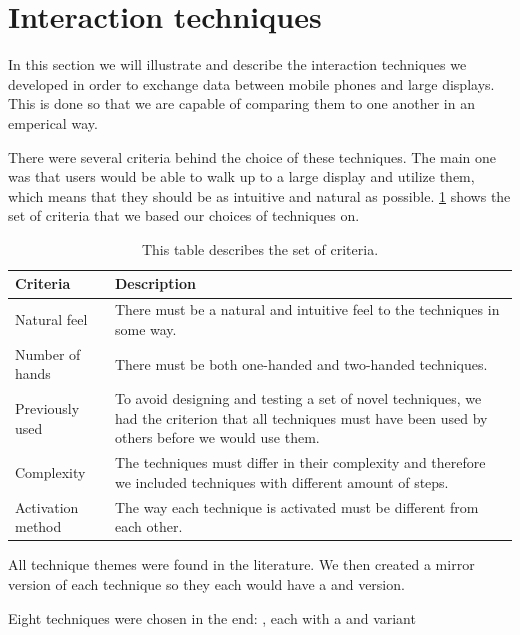 \section{Interaction techniques} \label{sec:techniques}
In this section we will illustrate and describe the interaction techniques we developed in order to exchange data between mobile phones and large displays.
This is done so that we are capable of comparing them to one another in an emperical way.

There were several criteria behind the choice of these techniques. 
The main one was that users would be able to walk up to a large display and utilize them, which means that they should be as intuitive and natural as possible. 
\cref{tab:techniqueCriteria} shows the set of criteria that we based our choices of techniques on.

\begin{table}[H]
	\centering
	\begin{tabular}{|p{}|p{}|}
		\hline
		\rowcolor[HTML]{9B9B9B} 
		\textbf{Criteria} & \textbf{Description} \\ \hline
		Natural feel & There must be a natural and intuitive feel to the techniques in some way. \\ \hline
		Number of hands & There must be both one-handed and two-handed techniques. \\ \hline
		Previously used & To avoid designing and testing a set of novel techniques, we had the criterion that all techniques must have been used by others before we would use them. \\ \hline
		Complexity & The techniques must differ in their complexity and therefore we included techniques with different amount of steps. \\ \hline
		Activation method & The way each technique is activated must be different from each other. \\ \hline
	\end{tabular}
	\caption{This table describes the set of criteria.}
	\label{tab:techniqueCriteria}
\end{table}


All technique themes were found in the literature.
We then created a mirror version of each technique so they each would have a \push and \pull version.

Eight techniques were chosen in the end: \alltechniques, each with a \push and \pull variant

